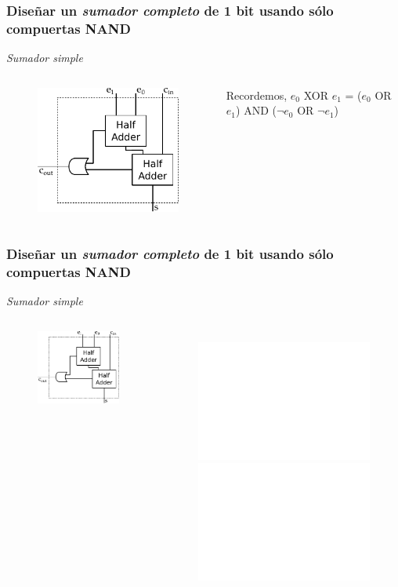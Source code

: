 \documentclass[mathserif,hyperref]{beamer}
\begin{document}
\begin{frame}[t]
\frametitle{\small Diseñar un \textit{sumador completo} de 1 bit usando sólo
compuertas NAND}
\textit{Sumador simple}
\begin{columns}[T]
  \begin{figure}[htp]
    \includegraphics[scale=0.6]{sumador-completo.pdf}
  \end{figure}

  Recordemos, $e_0$ XOR $e_1$ = ($e_0$ OR $e_1$) AND ($\lnot e_0$ OR $\lnot
  e_1$)
\end{columns}
\end{frame}


\begin{frame}[t]
\frametitle{\small Diseñar un \textit{sumador completo} de 1 bit usando sólo
compuertas NAND}
\textit{Sumador simple}
\begin{columns}[T]
  \begin{figure}[htp]
    \includegraphics[scale=0.9]{sumador-completo.pdf}
  \end{figure}

  \begin{figure}[htp]
    \includegraphics<1>[scale=0.9]{sumador-simple.pdf}
    \includegraphics<2>[scale=0.9]{sumador-completo.pdf}
  \end{figure}
\end{columns}
\end{frame}
\end{document}
